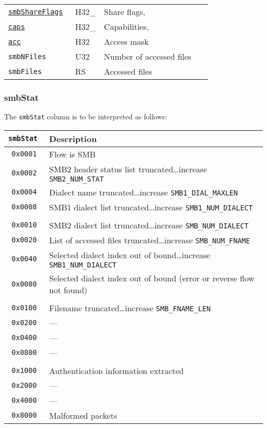 \documentclass[documentation]{subfiles}
\begin{document}
\begin{longtable}{>{\tt}lll>{\tt\small}l}
    \hyperref[smbShareFlagsCapsAcc]{smbShareFlags}  & H32\_         & Share flags,                               & \\
    \qquad\hyperref[smbShareFlagsCapsAcc]{caps}     & \qquad H32\_  & \qquad Capabilities,                       & \\
    \qquad\hyperref[smbShareFlagsCapsAcc]{acc}      & \qquad H32    & \qquad Access mask                         & \\
    smbNFiles                                       & U32           & Number of accessed files                   & \\
    smbFiles                                        & RS            & Accessed files                             & \\
    \bottomrule
\end{longtable}

\subsubsection{smbStat}\label{smbStat}
The {\tt smbStat} column is to be interpreted as follows:

\begin{longtable}{>{\tt}rl}
    \toprule
    {\bf smbStat} & {\bf Description}\\
    \midrule\endhead%
    0x0001 & Flow is SMB\\
    0x0002 & SMB2 header status list truncated\ldots increase {\tt SMB2\_NUM\_STAT}\\
    0x0004 & Dialect name truncated\ldots increase {\tt SMB1\_DIAL\_MAXLEN}\\
    0x0008 & SMB1 dialect list truncated\ldots increase {\tt SMB1\_NUM\_DIALECT}\\
    \\
    0x0010 & SMB2 dialect list truncated\ldots increase {\tt SMB\_NUM\_DIALECT}\\
    0x0020 & List of accessed files truncated\ldots increase {\tt SMB\_NUM\_FNAME}\\
    0x0040 & Selected dialect index out of bound\ldots increase {\tt SMB1\_NUM\_DIALECT}\\
    0x0080 & Selected dialect index out of bound (error or reverse flow not found)\\
    \\
    0x0100 & Filename truncated\ldots increase {\tt SMB\_FNAME\_LEN}\\
    0x0200 & ---\\
    0x0400 & ---\\
    0x0800 & ---\\
    \\
    0x1000 & Authentication information extracted\\
    0x2000 & ---\\
    0x4000 & ---\\
    0x8000 & Malformed packets\\
    \bottomrule
\end{longtable}
\end{document}
